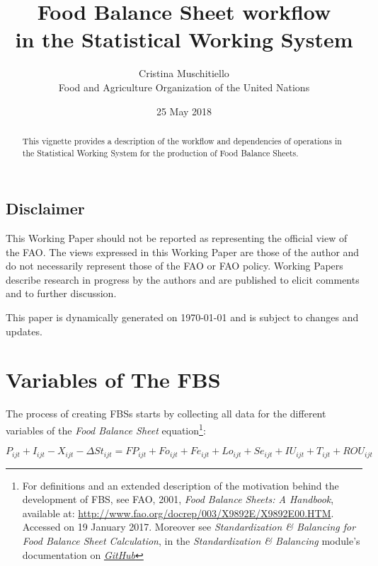 \documentclass[]{article}
\title{Food Balance Sheet workflow\\
in the Statistical Working System}
\author{Cristina Muschitiello\\
Food and Agriculture Organization of the United Nations}
\date{25 May 2018}
\let\rmarkdownfootnote\footnote%
\def\footnote{\protect\rmarkdownfootnote}
\begin{document}
\maketitle
\begin{abstract}
This vignette provides a description of the workflow and dependencies of
operations in the Statistical Working System for the production of Food
Balance Sheets.
\end{abstract}

{
\setcounter{tocdepth}{4}
\tableofcontents
}
\listoftables

\listoffigures

\newpage

\subsection*{Disclaimer}\label{disclaimer}

This Working Paper should not be reported as representing the official
view of the FAO. The views expressed in this Working Paper are those of
the author and do not necessarily represent those of the FAO or FAO
policy. Working Papers describe research in progress by the authors and
are published to elicit comments and to further discussion.

This paper is dynamically generated on \today{} and is subject to
changes and updates.

\section*{Variables of The FBS}\label{variables-of-the-fbs}

The process of creating FBSs starts by collecting all data for the
different variables of the \emph{Food Balance Sheet} equation\footnote{For
  definitions and an extended description of the motivation behind the
  development of FBS, see FAO, 2001, \emph{Food Balance Sheets: A
  Handbook}, available at:
  \url{http://www.fao.org/docrep/003/X9892E/X9892E00.HTM}. Accessed on
  19 January 2017. Moreover see \emph{Standardization \& Balancing for
  Food Balance Sheet Calculation}, in the \emph{Standardization \&
  Balancing} module's documentation on
  \href{https://github.com/SWS-Methodology/faoswsStandardization/tree/master/documentation}{\emph{GitHub}}}:

\begin{equation}
\label{eq:balance1}
P_{ijt} + I_{ijt} - X_{ijt} - \Delta St_{ijt} = FP_{ijt} + Fo_{ijt} + Fe_{ijt} + Lo_{ijt} + Se_{ijt} + IU_{ijt} + T_{ijt}  + ROU_{ijt}
\end{equation}
\end{document}
